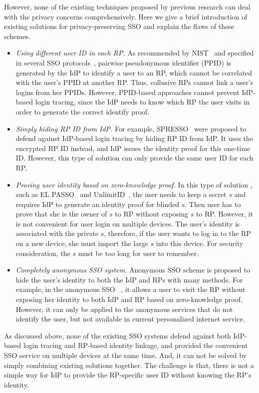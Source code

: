 However, none of the existing techniques proposed by previous research can deal with the privacy concerns comprehensively. Here we give a brief introduction of existing solutions for privacy-preserving SSO and explain the flaws of these schemes. 
\begin{itemize}
\item {\em Using different user ID in each RP. }As recommended by NIST~\cite{NIST2017draft} and specified in several SSO protocols~\cite{OpenIDConnect, SAMLIdentifier}, pairwise pseudonymous identifier (PPID) is generated by the IdP to identify a user to an RP, which cannot be correlated with the user's PPID at another RP. Thus, collusive RPs cannot link a user's logins from her PPIDs. However, PPID-based approaches cannot prevent IdP-based login tracing, since the IdP needs to know which RP the user visits in order to generate the correct identify proof.
\item {\em Simply hiding RP ID from IdP. }For example, SPRESSO~\cite{SPRESSO} were proposed to defend against IdP-based login tracing by hiding RP ID from IdP. It uses the encrypted RP ID instead, and IdP issues the identity proof for this one-time ID. However, this type of solution can only provide the same user ID for each RP.
\item {\em Proving user identity based on zero-knowledge proof. }In this type of solution , such as EL PASSO~\cite{ZhangKSZR21} and UnlimitID~\cite{IsaakidisHD16}, the user needs to keep a secret $s$ and requires IdP to generate an identity proof for blinded $s$. Then user has to prove that she is the owner of $s$ to RP without exposing $s$ to RP. However, it is not convenient for user login on multiple devices. The user's identity is associated with the private $s$, therefore, if the user wants to log in to the RP on a new device, she must import the large $s$ into this device. For security consideration, the $s$ must be too long for user to remember. 
\item {\em Completely anonymous SSO system. }Anonymous SSO scheme is proposed to hide the user's identity to both the IdP and RPs with many methods. For example, in the anonymous SSO ~\cite{HanCSTW18}, it allows a user to visit the RP without exposing her identity to both IdP and RP based on zero-knowledge proof. However, it can only be applied to the anonymous services that do not identify the user, but not available in current personalized internet service.
\end{itemize}


As discussed above, none of the existing SSO systems defend against both IdP-based login tracing and RP-based identity linkage, and provided the convenient SSO service on multiple devices at the same time.
And, it can not be solved by simply combining existing solutions together. The challenge is that, there is not a simple way for IdP to provide the RP-specific user ID without knowing the RP's identity.

